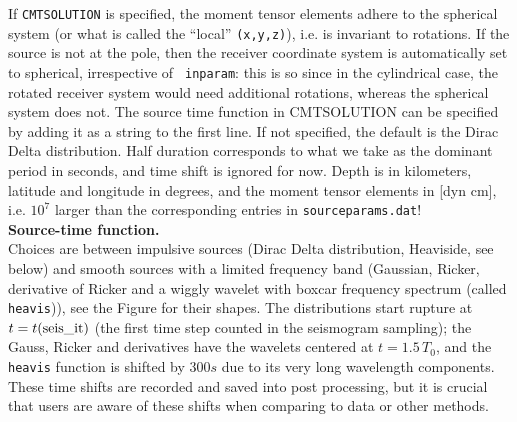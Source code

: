 \documentclass[11pt,letter,fleqn,english,notitlepage]{article}
\begin{document}
\noindent If {\tt CMTSOLUTION} is specified, the moment tensor elements adhere
to the spherical system (or what is called the ``local'' {\tt (x,y,z)}), i.e.
is invariant to rotations.  If the source is not at the pole, then the receiver
coordinate system is automatically set to spherical, irrespective of {\tt
inparam}: this is so since in the cylindrical case, the rotated receiver system
would need additional rotations, whereas the spherical system does not. The
source time function in CMTSOLUTION can be specified by adding it as a string
to the first line. If not specified, the default is the Dirac Delta
distribution. Half duration corresponds to what we take as the dominant period
in seconds, and time shift is ignored for now.  Depth is in kilometers,
latitude and longitude in degrees, and the moment tensor elements in [dyn cm],
i.e. $10^7$ larger than the corresponding entries in {\tt sourceparams.dat}! \\

\noindent \textbf{Source-time function.}\\
%
\noindent Choices are between impulsive sources (Dirac Delta distribution,
Heaviside, see below) and smooth sources with a limited frequency band
(Gaussian, Ricker, derivative of Ricker and a wiggly wavelet with boxcar
frequency spectrum (called {\tt heavis})), see the Figure for their shapes.
The distributions start rupture at $t=t({\rm seis\_it})$ (the first time step
counted in the seismogram sampling); the Gauss, Ricker and derivatives have the
wavelets centered at $t=1.5 \,T_0$, and the {\tt heavis} function is shifted by
$300 s$ due to its very long wavelength components. These time shifts are
recorded and saved into post processing, but it is crucial that users are aware
of these shifts when comparing to data or other methods. \\

% 
\end{document}
